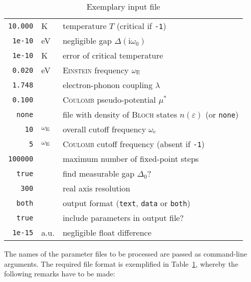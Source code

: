 \documentclass[twocolumn]{article}
\def\I{\mathrm i}
\def\sub#1{\sb{\mathrm{#1}}}
\let\epsilon\varepsilon
\let\Delta\varDelta
\newlength\gap
\let\name\textsc
\begin{document}
   \begin{table}
      \centering
      \begin{tabular}{r @{\,} *2l}
         \verb|10.000| & K & temperature $T$ (critical if \verb|-1|) \\
         [\gap]
         \verb|1e-10| & eV & negligible gap $\Delta(\I \omega_0)$ \\
         \verb|1e-10| & K & error of critical temperature \\
         [\gap]
         \verb|0.020| & eV & \name{Einstein} frequency $\omega \sub E$ \\
         \verb|1.748| && electron-phonon coupling $\lambda$ \\
         \verb|0.100| && \name{Coulomb} pseudo-potential $\mu^*$ \\
         [\gap]
         \verb|none| && file with density of \name{Bloch} states $n(\epsilon)$
            (or \verb|none|) \\
         [\gap]
         \verb|10| & $\omega \sub E$
            & overall cutoff frequency $\omega \sub c$\\
         \verb|5| & $\omega \sub E$
            & \name{Coulomb} cutoff frequency (absent if \verb|-1|) \\
         [\gap]
         \verb|100000| && maximum number of fixed-point steps \\
         [\gap]
         \verb|true| && find measurable gap $\Delta_0$? \\
         \verb|300| && real axis resolution \\
         [\gap]
         \verb|both| && output format
            (\verb|text|, \verb|data| or \verb|both|) \\
         \verb|true| && include parameters in output file? \\
         [\gap]
         \verb|1e-15| & a.u. & negligible float difference
      \end{tabular}
      \caption{Exemplary input file}
      \label{input}
   \end{table}
   The names of  the parameter files to be processed  are passed as command-line
   arguments.  The required  file  format is  exemplified in  Table~\ref{input},
   whereby the following remarks have to be made:
\end{document}
